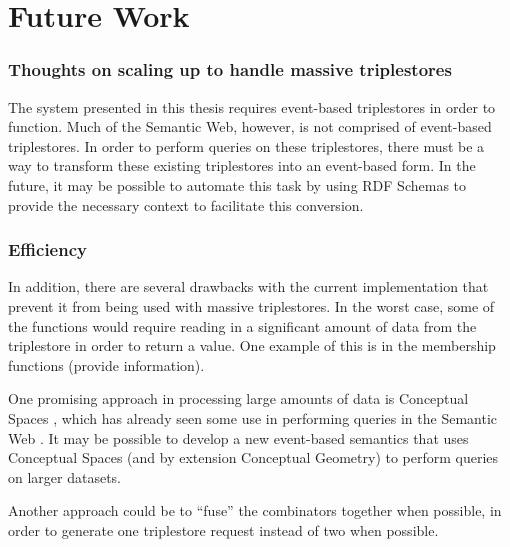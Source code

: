 \documentclass[../main.tex]{subfiles}
\begin{document}
	
\chapter{Future Work}

\subsection*{Thoughts on scaling up to handle massive triplestores}

The system presented in this thesis requires event-based triplestores in order to function.  Much of the Semantic Web, however, is not comprised of event-based triplestores.  In order to perform queries on these triplestores, there must be a way to transform these existing triplestores into an event-based form.  In the future, it may be possible to automate this task by using RDF Schemas\cite{owl}  to provide the necessary context to facilitate this conversion.

\subsection*{Efficiency}

In addition, there are several drawbacks with the current implementation that prevent it from being used with massive triplestores.  In the worst case, some of the functions would require reading in a significant amount of data from the triplestore in order to return a value.  One example of this is in the membership functions (provide information).

One promising approach in processing large amounts of data is Conceptual Spaces \cite{cs}, which has already seen some use in performing queries in the Semantic Web \cite{usesofcs}.  It may be possible to develop a new event-based semantics that uses Conceptual Spaces (and by extension Conceptual Geometry) to perform queries on larger datasets.

Another approach could be to ``fuse'' the combinators together when possible, in order to generate
one triplestore request instead of two when possible.
\end{document}
